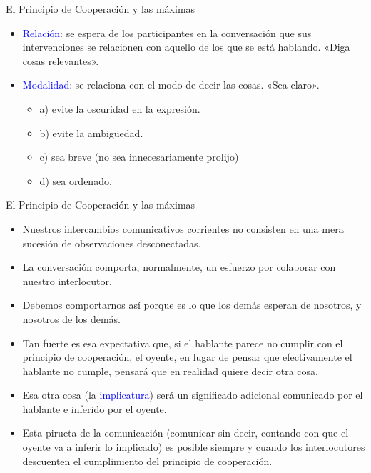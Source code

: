 \documentclass{beamer}
\begin{document}
\begin{frame}{El Principio de Cooperación y las máximas}

\begin{itemize}
	\item \textcolor{blue}{Relación}: se espera de los participantes en la conversación que sus intervenciones se relacionen con aquello de los que se está hablando. «Diga cosas relevantes».

	\vspace{0.3cm}
	
	\item \textcolor{blue}{Modalidad}: se relaciona con el modo de decir las cosas. «Sea claro».
	\begin{itemize}
		\item a) evite la oscuridad en la expresión.
		\item b) evite la ambigüedad.
		\item c) sea breve (no sea innecesariamente prolijo)
		\item d) sea ordenado.
	\end{itemize}
\end{itemize}

\end{frame}

\begin{frame}{El Principio de Cooperación y las máximas}

\begin{itemize}
	\item Nuestros intercambios comunicativos corrientes no consisten en una mera sucesión de observaciones desconectadas.
	\item La conversación comporta, normalmente, un esfuerzo por colaborar con nuestro interlocutor. 
	\item Debemos comportarnos así porque es lo que los demás esperan de nosotros, y nosotros de los demás.
	\item Tan fuerte es esa expectativa que, si el hablante parece no cumplir con el principio de cooperación, el oyente, en lugar de pensar que efectivamente el hablante no cumple, pensará que en realidad quiere decir otra cosa.
	\item Esa otra cosa (la \textcolor{blue}{implicatura}) será un significado adicional comunicado por el hablante e inferido por el oyente.
	\item Esta pirueta de la comunicación (comunicar sin decir, contando con que el oyente va a inferir lo implicado) es posible siempre y cuando los interlocutores descuenten el cumplimiento del principio de cooperación.
\end{itemize}

\end{frame}
\end{document}
